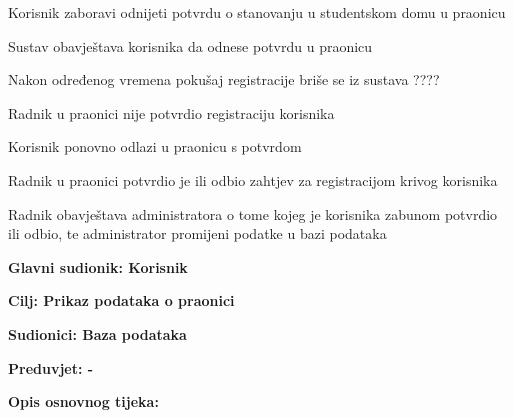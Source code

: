 \begin{packed_item}
\begin{packed_item}
						\item[4.a] Korisnik zaboravi odnijeti potvrdu o stanovanju u studentskom domu u praonicu
						\item[] \begin{packed_enum}
							
							\item Sustav obavještava korisnika da odnese potvrdu u praonicu
							\item Nakon određenog vremena pokušaj registracije briše se iz sustava ????
							
						\end{packed_enum}
					
						\item[5.a] Radnik u praonici nije potvrdio registraciju korisnika
						\item[] \begin{packed_enum}
							
							\item Korisnik ponovno odlazi u praonicu s potvrdom
							
						\end{packed_enum}
					
						\item[5.a] Radnik u praonici potvrdio je ili odbio zahtjev za registracijom krivog korisnika
						\item[] \begin{packed_enum}
							
							\item Radnik obavještava administratora o tome kojeg je korisnika zabunom potvrdio ili odbio, te administrator promijeni podatke u bazi podataka
							
						\end{packed_enum}
						
						
					\end{packed_item}
				
					\noindent {}
					\begin{packed_item}
						
						\item \textbf{Glavni sudionik: Korisnik}
						\item  \textbf{Cilj: Prikaz podataka o praonici}
						\item  \textbf{Sudionici: Baza podataka}
						\item  \textbf{Preduvjet: -}
						\item  \textbf{Opis osnovnog tijeka:}
						

\end{packed_item}
\end{packed_item}
